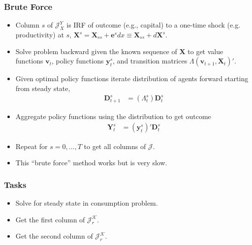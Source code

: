 \documentclass[english,xcolor=svgnames]{beamer}
\begin{document}
\begin{frame}
    \frametitle{Brute Force}
    \begin{itemize}
    	\item Column $s$ of $\mathcal{J}_X^Y$ is IRF of outcome (e.g., capital) to a one-time shock (e.g. productivity) at $s$, $\bm{X}^s = \bm{X}_{ss} + \bm{e}^s dx \equiv \bm{X}_{ss} + d \bm{X}^s$. 
        \item Solve problem backward given the known sequence of $\bm{X}$ to get value functions $\bm{v}_{t}$, policy functions $\bm{y}_t^s$, and transition matrices $\Lambda(\bm{v}_{t+1},\bm{X}_t)'$.
        \item Given optimal policy functions iterate distribution of agents forward starting from steady state,
        \begin{align*}
    		\bm{D}_{t+1}^s &= (\Lambda_t^s) \bm{D}_t^s 
    	\end{align*}
        \item Aggregate policy functions using the distribution to get outcome
        \begin{align*}
    		\mathbf{Y}_t^s &= (\bm{y}_t^s)'\bm{D}_t^s 
    	\end{align*}
        \item Repeat for $s=0,...,T$ to get all columns of $\mathcal{J}$.
        \item This ``brute force'' method works but is very slow.
    \end{itemize}
\end{frame}

\begin{frame}
    \frametitle{Tasks}
    \begin{itemize}
        \item Solve for steady state in consumption problem.
        \item Get the first column of $\mathcal{J}_r^{\mathcal{K}}$.
        \item Get the second column of $\mathcal{J}_r^{\mathcal{K}}$.
	\end{itemize}
\end{frame}
\end{document}
